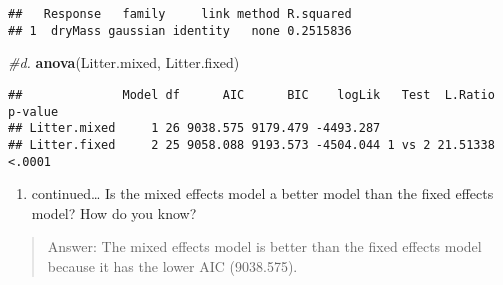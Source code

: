 \documentclass[]{article}
\newenvironment{Shaded}{\begin{snugshade}}{\end{snugshade}}
\newcommand{\KeywordTok}[1]{\textcolor[rgb]{0.13,0.29,0.53}{\textbf{#1}}}
\newcommand{\CommentTok}[1]{\textcolor[rgb]{0.56,0.35,0.01}{\textit{#1}}}
\newcommand{\NormalTok}[1]{#1}
\providecommand{\tightlist}{%
  \setlength{\itemsep}{0pt}\setlength{\parskip}{0pt}}
\begin{document}
\begin{verbatim}
##   Response   family     link method R.squared
## 1  dryMass gaussian identity   none 0.2515836
\end{verbatim}

\begin{Shaded}
\begin{Highlighting}[]
\CommentTok{#d. }
\KeywordTok{anova}\NormalTok{(Litter.mixed, Litter.fixed)}
\end{Highlighting}
\end{Shaded}

\begin{verbatim}
##              Model df      AIC      BIC    logLik   Test  L.Ratio p-value
## Litter.mixed     1 26 9038.575 9179.479 -4493.287                        
## Litter.fixed     2 25 9058.088 9193.573 -4504.044 1 vs 2 21.51338  <.0001
\end{verbatim}

\begin{enumerate}
\def\labelenumi{\alph{enumi}.}
\setcounter{enumi}{3}
\tightlist
\item
  continued\ldots{} Is the mixed effects model a better model than the
  fixed effects model? How do you know?
\end{enumerate}

\begin{quote}
Answer: The mixed effects model is better than the fixed effects model
because it has the lower AIC (9038.575).
\end{quote}
\end{document}
